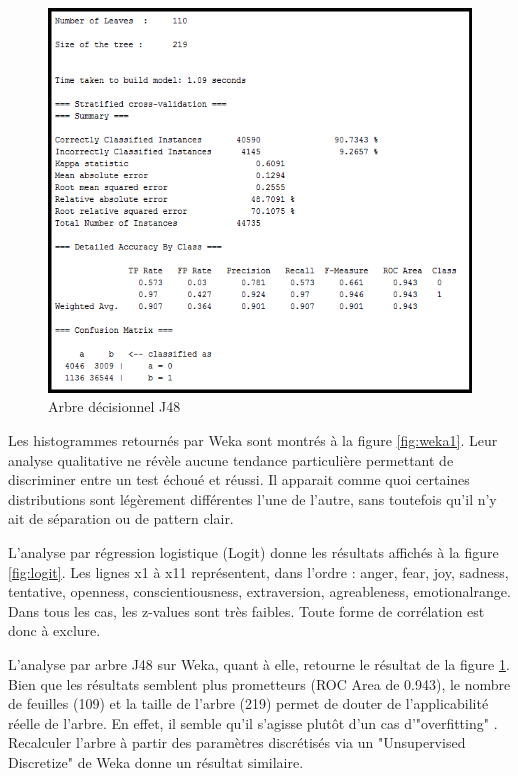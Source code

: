 \documentclass[10pt, conference]{IEEEtran}
\begin{document}
\begin{figure}[t]
  \includegraphics[width=\linewidth]{wekaresult.png}
  \caption{Arbre décisionnel J48}
  \label{fig:weka2}
\end{figure}

Les histogrammes retournés par Weka sont montrés à la figure \ref{fig:weka1}. Leur analyse qualitative ne révèle aucune tendance particulière permettant de discriminer entre un test échoué et réussi. Il apparait comme quoi certaines distributions sont légèrement différentes l'une de l'autre, sans toutefois qu'il n'y ait de séparation ou de pattern clair.

L’analyse par régression logistique (Logit) donne les résultats affichés à la figure \ref{fig:logit}. Les lignes x1 à x11 représentent, dans l’ordre : anger, fear, joy, sadness, tentative, openness, conscientiousness, extraversion, agreableness, emotionalrange. Dans tous les cas, les z-values sont très faibles. Toute forme de corrélation est donc à exclure. 

L’analyse par arbre J48 sur Weka, quant à elle, retourne le résultat de la figure \ref{fig:weka2}. Bien que les résultats semblent plus prometteurs (ROC Area de 0.943), le nombre de feuilles (109) et la taille de l’arbre (219) permet de douter de l’applicabilité réelle de l’arbre. En effet, il semble qu'il s'agisse plutôt d'un cas d'"overfitting" \cite{c6}. Recalculer l'arbre à partir des paramètres discrétisés via un "Unsupervised Discretize" de Weka donne un résultat similaire.
\end{document}
